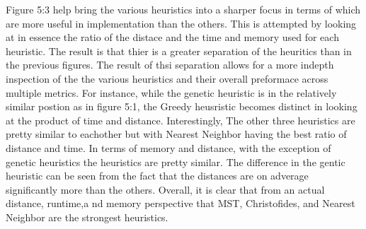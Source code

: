 \documentclass[midd]{thesis}
\newcommand{\tab}{\hspace*{2em}}
\begin{document}
\tab Figure 5:3 help bring the various heuristics into a sharper focus in terms of which are more useful in implementation than the others. This is attempted by looking at in essence the ratio of the distace and the time and memory used for each heuristic. The result is that thier is a greater separation of the heuritics than in the previous figures. The result of thsi separation allows for a more indepth inspection of the the various heuristics and their overall preformace across multiple metrics. For instance, while the genetic heuristic is in the relatively similar postion as in figure 5:1, the Greedy heusristic becomes distinct in looking at the product of time and distance. Interestingly, The other three heuristics are pretty similar to eachother but with Nearest Neighbor having the best ratio of distance and time. In terms of memory and distance, with the exception of genetic heuristics the heuristics are pretty similar. The difference in the gentic heuristic can be seen from the fact that the distances are on adverage significantly more than the others. Overall, it is clear that from an actual distance, runtime,a nd memory perspective that MST, Christofides, and Nearest Neighbor are the strongest heuristics.
\end{document}
